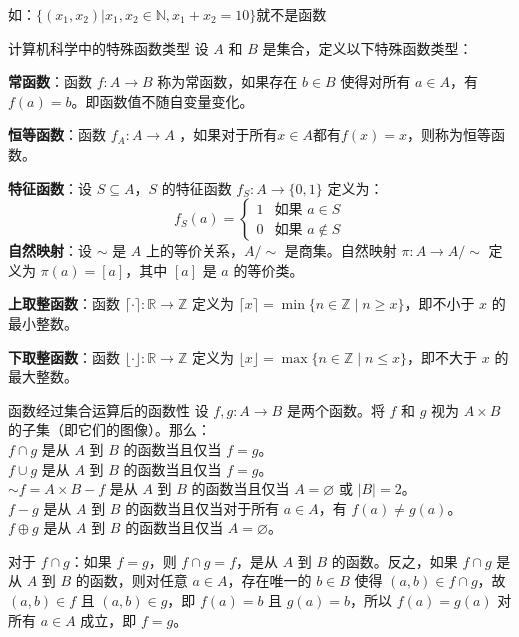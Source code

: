 \documentclass[lang=cn,11pt]{elegantbook}
\begin{document}
如：$\{(x_1,x_2)|x_1,x_2\in\mathbb{N},x_1+x_2=10\}$就不是函数
\begin{definition}{计算机科学中的特殊函数类型}
设 $A$ 和 $B$ 是集合，定义以下特殊函数类型：

\textbf{常函数}：函数 $f: A \to B$ 称为常函数，如果存在 $b \in B$ 使得对所有 $a \in A$，有 $f(a) = b$。即函数值不随自变量变化。

\textbf{恒等函数}：函数 $f_A: A \to A$ ，如果对于所有$x\in A$都有$f(x)=x$，则称为恒等函数。

\textbf{特征函数}：设 $S \subseteq A$，$S$ 的特征函数 $f_S: A \to \{0,1\}$ 定义为：
\[
f_S(a) = 
\begin{cases}
1 & \text{如果 } a \in S \\
0 & \text{如果 } a \notin S
\end{cases}
\]
\textbf{自然映射}：设 $\sim$ 是 $A$ 上的等价关系，$A/\sim$ 是商集。自然映射 $\pi: A \to A/\sim$ 定义为 $\pi(a) = [a]$，其中 $[a]$ 是 $a$ 的等价类。

\textbf{上取整函数}：函数 $\lceil \cdot \rceil: \mathbb{R} \to \mathbb{Z}$ 定义为 $\lceil x \rceil = \min\{n \in \mathbb{Z} \mid n \geqslant x\}$，即不小于 $x$ 的最小整数。

\textbf{下取整函数}：函数 $\lfloor \cdot \rfloor: \mathbb{R} \to \mathbb{Z}$ 定义为 $\lfloor x \rfloor = \max\{n \in \mathbb{Z} \mid n \leqslant x\}$，即不大于 $x$ 的最大整数。
\end{definition}
\begin{theorem}{函数经过集合运算后的函数性}
设 $f, g: A \to B$ 是两个函数。将 $f$ 和 $g$ 视为 $A \times B$ 的子集（即它们的图像）。那么：\\
$f \cap g$ 是从 $A$ 到 $B$ 的函数当且仅当 $f = g$。\\
$f \cup g$ 是从 $A$ 到 $B$ 的函数当且仅当 $f = g$。\\
$\sim f = A \times B - f$ 是从 $A$ 到 $B$ 的函数当且仅当 $A = \varnothing$ 或 $|B|=2$。\\
$f - g$ 是从 $A$ 到 $B$ 的函数当且仅当对于所有 $a \in A$，有 $f(a) \neq g(a)$。\\
$f \oplus g$ 是从 $A$ 到 $B$ 的函数当且仅当 $A = \varnothing$。
\end{theorem}

对于 $f \cap g$：如果 $f = g$，则 $f \cap g = f$，是从 $A$ 到 $B$ 的函数。反之，如果 $f \cap g$ 是从 $A$ 到 $B$ 的函数，则对任意 $a \in A$，存在唯一的 $b \in B$ 使得 $(a, b) \in f \cap g$，故 $(a, b) \in f$ 且 $(a, b) \in g$，即 $f(a) = b$ 且 $g(a) = b$，所以 $f(a) = g(a)$ 对所有 $a \in A$ 成立，即 $f = g$。
\end{document}
